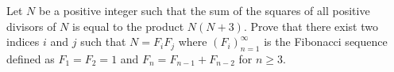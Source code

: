 Let $N$ be a positive integer such that the sum of the squares of all positive divisors of $N$ is equal to the product $N(N+3)$. Prove that there exist two indices $i$ and $j$ such that $N=F_iF_j$ where $(F_i)_{n=1}^{\infty}$ is the Fibonacci sequence defined as $F_1=F_2=1$ and $F_n=F_{n-1}+F_{n-2}$ for $n\geq 3$.